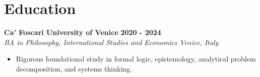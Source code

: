 \documentclass[10pt,a4paper]{article}
\newcommand{\role}[4]{%
  \textbf{#1} \hfill \textbf{#2}\\[1pt]%
  \textit{#3} \hfill \textit{#4}\\[2pt]%
}
\begin{document}
\section{Education}
\role{Ca' Foscari University of Venice}{2020 - 2024}{BA in Philosophy, International Studies and Economics}{Venice, Italy}
\begin{itemize}
  \item Rigorous foundational study in formal logic, epistemology, analytical problem decomposition, and systems thinking.
\end{itemize}
\end{document}
